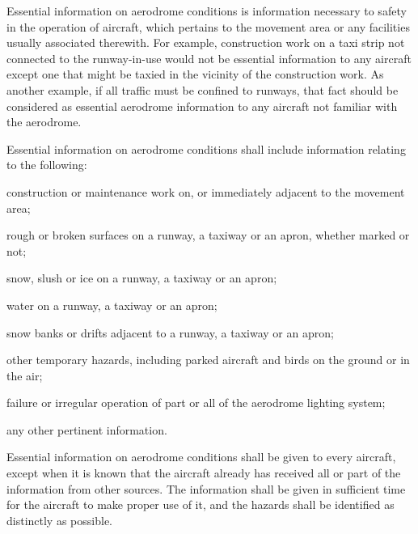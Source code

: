 \begin{enumnoss}
    \item \label{7.5.1} Essential information on aerodrome conditions is information necessary to safety in the operation of aircraft, which pertains to the movement area or any facilities usually associated therewith. For example, construction work on a taxi strip not connected to the runway-in-use would not be essential information to any aircraft except one that might be taxied in the vicinity of the construction work. As another example, if all traffic must be confined to runways, that fact should be considered as essential aerodrome information to any aircraft not familiar with the aerodrome.
    \item \label{7.5.2} Essential information on aerodrome conditions shall include information relating to the following:

    \begin{enumalph}
        \item construction or maintenance work on, or immediately adjacent to the movement area;
        \item rough or broken surfaces on a runway, a taxiway or an apron, whether marked or not;
        \item snow, slush or ice on a runway, a taxiway or an apron;
        \item water on a runway, a taxiway or an apron;
        \item snow banks or drifts adjacent to a runway, a taxiway or an apron;
        \item other temporary hazards, including parked aircraft and birds on the ground or in the air;
        \item failure or irregular operation of part or all of the aerodrome lighting system;
        \item any other pertinent information.
    \end{enumalph}


    \item Essential information on aerodrome conditions shall be given to every aircraft, except when it is known that the aircraft already has received all or part of the information from other sources. The information shall be given in sufficient time for the aircraft to make proper use of it, and the hazards shall be identified as distinctly as possible.


\end{enumnoss}
